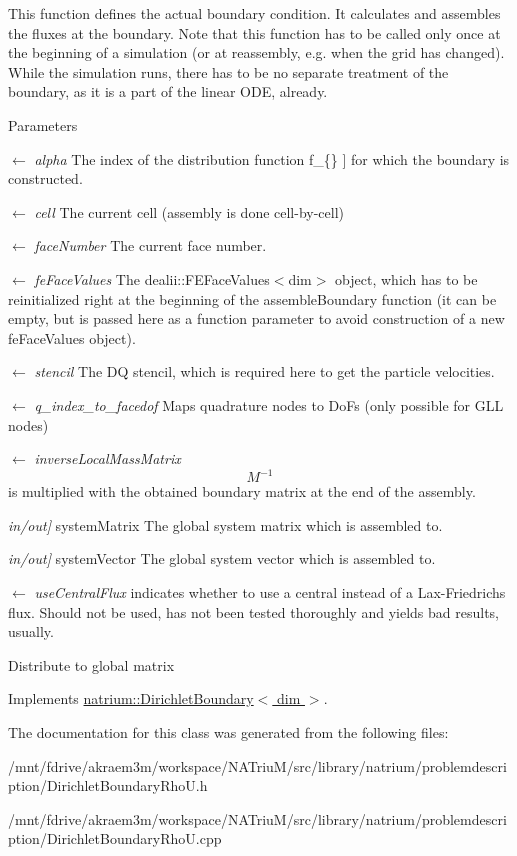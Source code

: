 This function defines the actual boundary condition. It calculates and assembles the fluxes at the boundary. Note that this function has to be called only once at the beginning of a simulation (or at reassembly, e.g. when the grid has changed). While the simulation runs, there has to be no separate treatment of the boundary, as it is a part of the linear ODE, already. 
\begin{DoxyParams}{Parameters}
\item[\mbox{$\leftarrow$} {\em alpha}]The index of the distribution function  f\_\-\{\} \mbox{]} for which the boundary is constructed. \item[\mbox{$\leftarrow$} {\em cell}]The current cell (assembly is done cell-\/by-\/cell) \item[\mbox{$\leftarrow$} {\em faceNumber}]The current face number. \item[\mbox{$\leftarrow$} {\em feFaceValues}]The dealii::FEFaceValues$<$dim$>$ object, which has to be reinitialized right at the beginning of the assembleBoundary function (it can be empty, but is passed here as a function parameter to avoid construction of a new feFaceValues object). \item[\mbox{$\leftarrow$} {\em stencil}]The DQ stencil, which is required here to get the particle velocities. \item[\mbox{$\leftarrow$} {\em q\_\-index\_\-to\_\-facedof}]Maps quadrature nodes to DoFs (only possible for GLL nodes) \item[\mbox{$\leftarrow$} {\em inverseLocalMassMatrix}]\[ M^{-1} \] is multiplied with the obtained boundary matrix at the end of the assembly. \item[{\em in/out\mbox{]}}]systemMatrix The global system matrix which is assembled to. \item[{\em in/out\mbox{]}}]systemVector The global system vector which is assembled to. \item[\mbox{$\leftarrow$} {\em useCentralFlux}]indicates whether to use a central instead of a Lax-\/Friedrichs flux. Should not be used, has not been tested thoroughly and yields bad results, usually. \end{DoxyParams}


Distribute to global matrix 

Implements \hyperlink{classnatrium_1_1DirichletBoundary_a4f6ff88796031a747cab3db1be4ac603}{natrium::DirichletBoundary$<$ dim $>$}.

The documentation for this class was generated from the following files:\begin{DoxyCompactItemize}
\item 
/mnt/fdrive/akraem3m/workspace/NATriuM/src/library/natrium/problemdescription/DirichletBoundaryRhoU.h\item 
/mnt/fdrive/akraem3m/workspace/NATriuM/src/library/natrium/problemdescription/DirichletBoundaryRhoU.cpp\end{DoxyCompactItemize}
